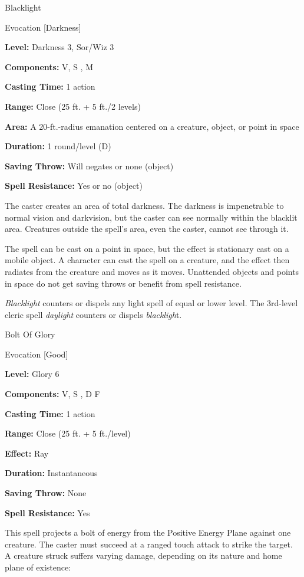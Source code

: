 \documentclass{article}
\begin{document}
\vspace{12pt}
Blacklight

Evocation [Darkness]

\textbf{Level: }Darkness 3, Sor/Wiz 3

\textbf{Components:} V, S , M

\textbf{Casting Time:} 1 action

\textbf{Range:} Close (25 ft. + 5 ft./2 levels)

\textbf{Area:} A 20-ft.-radius emanation centered on a creature, object, or point 
in space

\textbf{Duration:} 1 round/level (D)

\textbf{Saving Throw:} Will negates or none (object)

\textbf{Spell Resistance:} Yes or no (object)

The caster creates an area of total darkness. The darkness is impenetrable to normal 
vision and darkvision, but the caster can see normally within the blacklit area. 
Creatures outside the spell's area, even the caster, cannot see through it.

The spell can be cast on a point in space, but the effect is stationary cast on 
a mobile object. A character can cast the spell on a creature, and the effect then 
radiates from the creature and moves as it moves. Unattended objects and points 
in space do not get saving throws or benefit from spell resistance.

\textit{Blacklight }counters or dispels any light spell of equal or lower level. 
The 3rd-level cleric spell \textit{daylight }counters or dispels \textit{blackligh}t.

\vspace{12pt}
Bolt Of Glory

Evocation [Good]

\textbf{Level:} Glory 6

\textbf{Components:} V, S , D F

\textbf{Casting Time:} 1 action

\textbf{Range:} Close (25 ft. + 5 ft./level)

\textbf{Effect:} Ray

\textbf{Duration:} Instantaneous

\textbf{Saving Throw:} None

\textbf{Spell Resistance:} Yes

This spell projects a bolt of energy from the Positive Energy Plane against one 
creature. The caster must succeed at a ranged touch attack to strike the target. 
A creature struck suffers varying damage, depending on its nature and home plane 
of existence:
\end{document}
